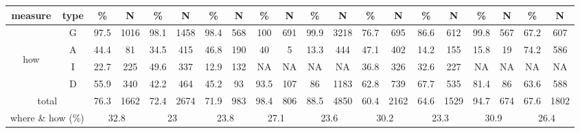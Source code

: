 \begin{table}
\begin{center}
\begin{footnotesize}
\begin{tabular}{|cc|cc|cc|cc|cc|cc|cc|cc|cc|cc|}
\hline
measure & type & \% & N & \% & N & \% & N & \% & N & \% & N & \% & N & \% & N & \% & N & \% & N \\
\hline
 & G & 97.5 & 1016 & 98.1 & 1458 & 98.4 & 568 & 100 & 691 & 99.9 & 3218 & 76.7 & 695 & 86.6 & 612 & 99.8 & 567 & 67.2 & 607 \\
\multirow{3}{3mm}{\begin{sideways}\parbox{3mm}{\begin{small}how\end{small}}\end{sideways}}
 & A & 44.4 & 81 & 34.5 & 415 & 46.8 & 190 & 40 & 5 & 13.3 & 444 & 47.1 & 402 & 14.2 & 155 & 15.8 & 19 & 74.2 & 586 \\
 & I & 22.7 & 225 & 49.6 & 337 & 12.9 & 132 & NA & NA & NA & NA & 36.8 & 326 & 32.6 & 227 & NA & NA & NA & NA \\
 & D & 55.9 & 340 & 42.2 & 464 & 45.2 & 93 & 93.5 & 107 & 86 & 1183 & 62.8 & 739 & 67.7 & 535 & 81.4 & 86 & 63.6 & 588 \\
\multicolumn{2}{|c|}{total} & 76.3 & 1662 & 72.4 & 2674 & 71.9 & 983 & 98.4 & 806 & 88.5 & 4850 & 60.4 & 2162 & 64.6 & 1529 & 94.7 & 674 & 67.6 & 1802 \\
\hline
\multicolumn{2}{|c|}{where \& how (\%)} & \multicolumn{2}{|c|}{32.8} & \multicolumn{2}{|c|}{23}& \multicolumn{2}{|c|}{23.8}& \multicolumn{2}{|c|}{27.1}& \multicolumn{2}{|c|}{23.6}& \multicolumn{2}{|c|}{30.2}& \multicolumn{2}{|c|}{23.3}& \multicolumn{2}{|c|}{30.9}& \multicolumn{2}{|c|}{26.4}\\
\hline
\end{tabular}
\label{tab:all_results}
\end{footnotesize}
\end{center}
\end{table}


